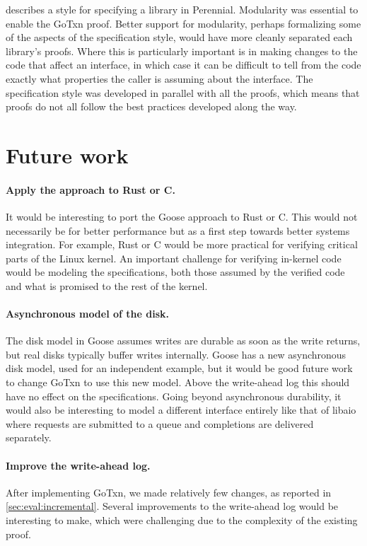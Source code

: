  describes a style for specifying a library in Perennial.
Modularity was essential to enable the GoTxn proof. Better support for
modularity, perhaps formalizing some of the aspects of the specification style,
would have more cleanly separated each library's proofs. Where this is
particularly important is in making changes to the code that affect an
interface, in which case it can be difficult to tell from the code exactly what
properties the caller is assuming about the interface. The specification style
was developed in parallel with all the proofs, which means that proofs do not
all follow the best practices developed along the way.

\section{Future work}

\paragraph{Apply the approach to Rust or C.} It would be interesting to port
the Goose approach to Rust or C. This would not necessarily be for better
performance but as a first step towards better systems integration. For example,
Rust or C would be more practical for verifying critical parts of the Linux
kernel. An important challenge for verifying in-kernel code would be modeling
the specifications, both those assumed by the verified code and what is promised
to the rest of the kernel.

\paragraph{Asynchronous model of the disk.} The disk model in Goose assumes
writes are durable as soon as the write returns, but real disks typically buffer
writes internally. Goose has a new asynchronous disk model, used for an
independent example, but it would be good future work to change GoTxn to use
this new model. Above the write-ahead log this should have no effect on the
specifications. Going beyond asynchronous durability, it would also be
interesting to model a different interface entirely like that of libaio where
requests are submitted to a queue and completions are delivered separately.

\paragraph{Improve the write-ahead log.} After implementing GoTxn, we made
relatively few changes, as reported in \cref{sec:eval:incremental}. Several
improvements to the write-ahead log would be interesting to make, which were
challenging due to the complexity of the existing proof.

